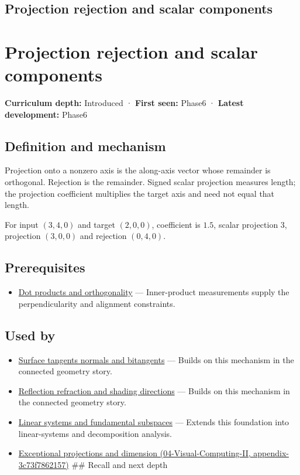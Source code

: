 \hypertarget{appendix-505a502c372a}{}
\section*{Projection rejection and scalar components}
\chapter{Projection rejection and scalar components}\label{appendix-505a502c372a-projection-rejection-and-scalar-components}

\textbf{Curriculum depth:} Introduced · \textbf{First seen:} Phase6 · \textbf{Latest development:} Phase6

\section{Definition and mechanism}\label{appendix-505a502c372a-definition-and-mechanism}

Projection onto a nonzero axis is the along-axis vector whose remainder is orthogonal. Rejection is the remainder. Signed scalar projection measures length; the projection coefficient multiplies the target axis and need not equal that length.

For input \((3,4,0)\) and target \((2,0,0)\), coefficient is \(1.5\), scalar projection \(3\), projection \((3,0,0)\) and rejection \((0,4,0)\).

\section{Prerequisites}\label{appendix-505a502c372a-prerequisites}

\begin{itemize}
\tightlist
\item
  \hyperref[appendix-8bc4e8fc547c]{Dot products and orthogonality} --- Inner-product measurements supply the perpendicularity and alignment constraints.
\end{itemize}

\section{Used by}\label{appendix-505a502c372a-used-by}

\begin{itemize}
\item
  \hyperref[appendix-e31893dec985]{Surface tangents normals and bitangents} --- Builds on this mechanism in the connected geometry story.
\item
  \hyperref[appendix-44e00863b4d5]{Reflection refraction and shading directions} --- Builds on this mechanism in the connected geometry story.
\item
  \hyperref[appendix-8572a4a060c1]{Linear systems and fundamental subspaces} --- Extends this foundation into linear-systems and decomposition analysis.
\item
  \href{../04-Visual-Computing-II/main.pdf\#nameddest=appendix-3c73f7862157}{Exceptional projections and dimension (04-Visual-Computing-II, appendix-3c73f7862157)} \#\# Recall and next depth
\end{itemize}

